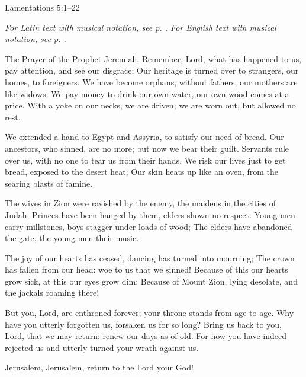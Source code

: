 \hfill Lamentations 5:1–22
\par\vspace{5pt}
\textit{For Latin text with musical notation, see p. \pageref{Oratio Ieremiæ}. For English text with musical notation, see p. \pageref{Prayer of Jeremiah}.}
\par\vspace{5pt}

The Prayer of the Prophet Jeremiah. Remember, Lord, what has happened to us,
    pay attention, and see our disgrace:
Our heritage is turned over to strangers,
    our homes, to foreigners.
We have become orphans, without fathers;
    our mothers are like widows.
We pay money to drink our own water,
    our own wood comes at a price.
With a yoke on our necks, we are driven;
    we are worn out, but allowed no rest.

We extended a hand to Egypt and Assyria,
    to satisfy our need of bread.
Our ancestors, who sinned, are no more;
    but now we bear their guilt.
Servants rule over us,
    with no one to tear us from their hands.
We risk our lives just to get bread,
    exposed to the desert heat;
Our skin heats up like an oven,
    from the searing blasts of famine.

The wives in Zion were ravished by the enemy,
    the maidens in the cities of Judah;
Princes have been hanged by them,
    elders shown no respect.
Young men carry millstones,
    boys stagger under loads of wood;
The elders have abandoned the gate,
    the young men their music.

The joy of our hearts has ceased,
    dancing has turned into mourning;
The crown has fallen from our head:
    woe to us that we sinned!
Because of this our hearts grow sick,
    at this our eyes grow dim:
Because of Mount Zion, lying desolate,
    and the jackals roaming there!

But you, Lord, are enthroned forever;
    your throne stands from age to age.
Why have you utterly forgotten us,
    forsaken us for so long?
Bring us back to you, Lord, that we may return:
    renew our days as of old.
For now you have indeed rejected us
    and utterly turned your wrath against us.
    
    Jerusalem, Jerusalem, return to the Lord your God!
